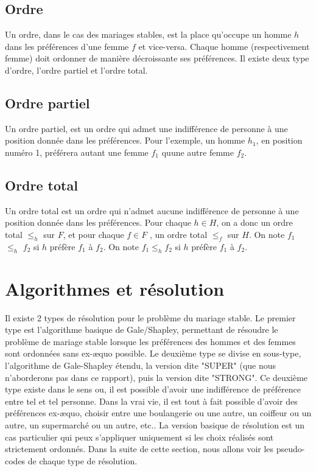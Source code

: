 \documentclass[11pt]{article}
\begin{document}
\subsection{Ordre}
Un ordre, dans le cas des mariages stables, est la place qu'occupe un homme $h$ dans les préférences d'une femme $f$ et vice-versa. Chaque homme (respectivement femme) doit ordonner de manière décroissante ses préférences. Il existe deux type d'ordre, l'ordre partiel et l'ordre total.

\subsection{Ordre partiel}
Un ordre partiel, est un ordre qui admet une indifférence de personne à une position donnée dans les préférences. Pour l'exemple, un homme $h_1$, en position numéro 1, préférera autant une femme $f_1$ quune autre femme $f_2$.


\subsection{Ordre total}
Un ordre total est un ordre qui n'admet aucune indifférence de personne à une position donnée dans les préférences.
Pour chaque $h \in H$, on a donc un ordre total $\leq_h$ sur $F$, et pour
chaque $f \in F$ , un ordre total $\leq_f$ sur $H$.
On note $f_1$ $\leq_h$ $f_2$ si $h$ préfère $f_1$ à $f_2$.
On note $f_1 \leq_h f_2$ si $h$ préfère $f_1$ à $f_2$.

\section{Algorithmes et résolution}
Il existe 2 types de résolution pour le problème du mariage stable.
Le premier type est l'algorithme basique de Gale/Shapley, permettant de résoudre le problème de mariage stable lorsque les préférences des hommes et des femmes sont ordonnées sans ex-æquo possible. Le deuxième type se divise en sous-type, l'algorithme de Gale-Shapley étendu, la version dite "SUPER" (que nous n'aborderons pas dans ce rapport), puis la version dite "STRONG". Ce deuxième type existe dans le sens ou, il est possible d'avoir une indifférence de préférence entre tel et tel personne. Dans la vrai vie, il est tout à fait possible d'avoir des préférences ex-æquo, choisir entre une boulangerie ou une autre, un coiffeur ou un autre, un supermarché ou un autre, etc.. La version basique de résolution est un cas particulier qui peux s'appliquer uniquement si les choix réalisés sont strictement ordonnés. Dans la suite de cette section, nous allons voir les pseudo-codes de chaque type de résolution.
\newpage
\end{document}
